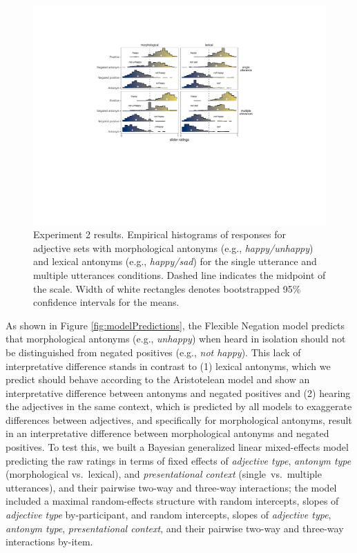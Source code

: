 \documentclass[floatsintext,doc]{apa6}
\begin{document}
\begin{figure}[t]
\centering \includegraphics[width=0.95\linewidth]{figs/expt2_directlabel_hist} 
\caption{Experiment 2 results. Empirical histograms of responses for adjective sets with morphological antonyms (e.g., \emph{happy/unhappy}) and lexical antonyms (e.g., \emph{happy/sad}) for the single utterance and multiple utterances conditions. Dashed line indicates the midpoint of the scale. Width of white rectangles denotes bootstrapped 95\% confidence intervals for the means.}
\label{fig:expt2-results}
\end{figure}

As shown in Figure \ref{fig:modelPredictions}, the Flexible Negation model predicts that morphological antonyms (e.g., \emph{unhappy}) when heard in isolation should not be distinguished from negated positives (e.g., \emph{not happy}). This lack of interpretative difference stands in contrast to (1) lexical antonyms, which we predict should behave according to the Aristotelean model and show an interpretative difference between antonyms and negated positives and (2) hearing the adjectives in the same context, which is predicted by all models to exaggerate differences between adjectives, and specifically for morphological antonyms, result in an interpretative difference between morphological antonyms and negated positives.
To test this, we built a Bayesian generalized linear mixed-effects model predicting the raw ratings in terms of fixed effects of \emph{adjective type}, \emph{antonym type} (morphological vs.~lexical),  and \emph{presentational context} (single~vs.~multiple utterances), and their pairwise two-way and three-way interactions; the model included a maximal random-effects structure with random intercepts, slopes of \emph{adjective type} by-participant, and random intercepts, slopes of \emph{adjective type}, \emph{antonym type}, \emph{presentational context}, and their pairwise two-way and three-way interactions by-item.
\end{document}
